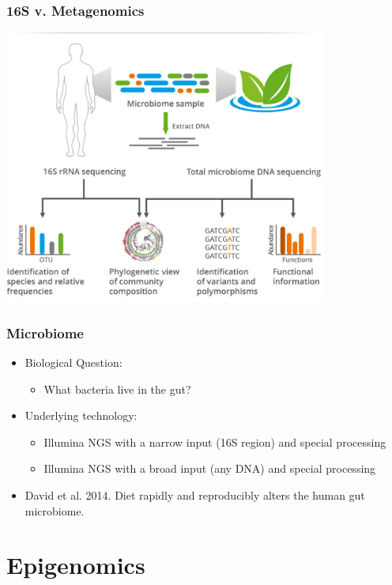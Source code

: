 \documentclass[14pt]{beamer}
\begin{document}
\begin{frame}
\frametitle{16S v. Metagenomics}
\centerline{\includegraphics[width=0.8\textwidth]{images_20170926_microbiome.png}}
\end{frame}

\begin{frame}
\frametitle{Microbiome}
\begin{itemize}
	\item<+-> Biological Question:
	\begin{itemize}
		\item<+-> What bacteria live in the gut? 
	\end{itemize}
	\item<+-> Underlying technology:
	\begin{itemize}
		\item<+-> Illumina NGS with a narrow input (16S region) and special processing
		\item<+-> Illumina NGS with a broad input (any DNA) and special processing
	\end{itemize}
	\item<+-> David et al. 2014. Diet rapidly and reproducibly alters the human gut microbiome.
\end{itemize}
\end{frame}



\section{Epigenomics}
\end{document}
